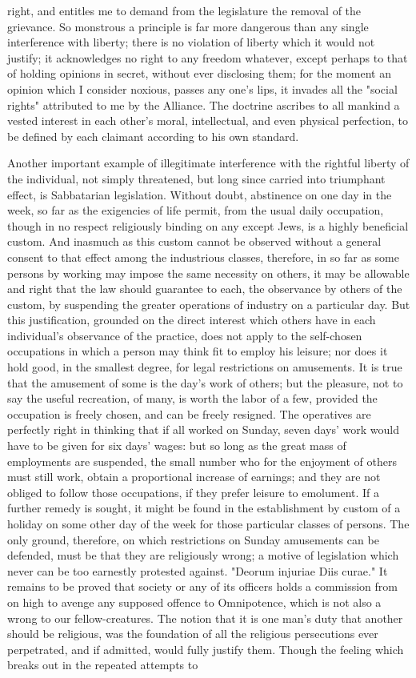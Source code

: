 \documentclass[12pt]{report}
\begin{document}
right, and entitles me to demand from the legislature the removal of the grievance. So monstrous a principle is far more dangerous than any single interference with liberty; there is no violation of liberty which it would not justify; it acknowledges no right to any freedom whatever, except perhaps to that of holding opinions in secret, without ever disclosing them; for the moment an opinion which I consider noxious, passes any one's lips, it invades all the "social rights" attributed to me by the Alliance. The doctrine ascribes to all mankind a vested interest in each other's moral, intellectual, and even physical perfection, to be defined by each claimant according to his own standard.

Another important example of illegitimate interference with the rightful liberty of the individual, not simply threatened, but long since carried into triumphant effect, is Sabbatarian legislation. Without doubt, abstinence on one day in the week, so far as the exigencies of life permit, from the usual daily occupation, though in no respect religiously binding on any except Jews, is a highly beneficial custom. And inasmuch as this custom cannot be observed without a general consent to that effect among the industrious classes, therefore, in so far as some persons by working may impose the same necessity on others, it may be allowable and right that the law should guarantee to each, the observance by others of the custom, by suspending the greater operations of industry on a particular day. But this justification, grounded on the direct interest which others have in each individual's observance of the practice, does not apply to the self-chosen occupations in which a person may think fit to employ his leisure; nor does it hold good, in the smallest degree, for legal restrictions on amusements. It is true that the amusement of some is the day's work of others; but the pleasure, not to say the useful recreation, of many, is worth the labor of a few, provided the occupation is freely chosen, and can be freely resigned. The operatives are perfectly right in thinking that if all worked on Sunday, seven days' work would have to be given for six days' wages: but so long as the great mass of employments are suspended, the small number who for the enjoyment of others must still work, obtain a proportional increase of earnings; and they are not obliged to follow those occupations, if they prefer leisure to emolument. If a further remedy is sought, it might be found in the establishment by custom of a holiday on some other day of the week for those particular classes of persons. The only ground, therefore, on which restrictions on Sunday amusements can be defended, must be that they are religiously wrong; a motive of legislation which never can be too earnestly protested against. "Deorum injuriae Diis curae." It remains to be proved that society or any of its officers holds a commission from on high to avenge any supposed offence to Omnipotence, which is not also a wrong to our fellow-creatures. The notion that it is one man's duty that another should be religious, was the foundation of all the religious persecutions ever perpetrated, and if admitted, would fully justify them. Though the feeling which breaks out in the repeated attempts to 
\end{document}
